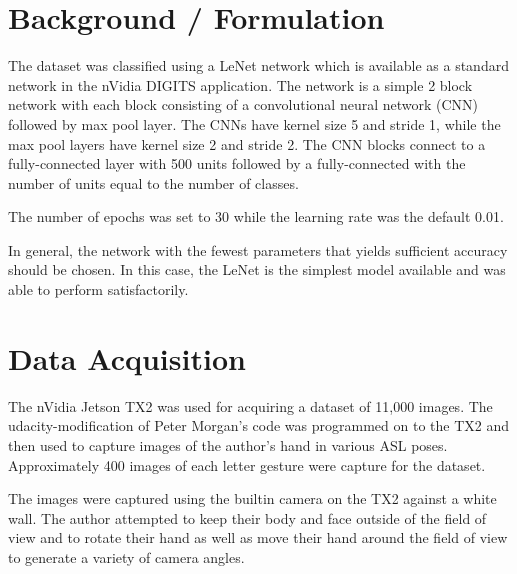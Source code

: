\documentclass[10pt,journal,compsoc]{IEEEtran}
\begin{document}
\section{Background / Formulation}
The dataset was classified using a LeNet\cite{Lecun98gradient-basedlearning} network which is available as a standard network in the nVidia DIGITS application. The network is a simple 2 block network with each block consisting of a convolutional neural network (CNN) followed by max pool layer. The CNNs have kernel size 5 and stride 1, while the max pool layers have kernel size 2 and stride 2. The CNN blocks connect to a fully-connected layer with 500 units followed by a fully-connected with the number of units equal to the number of classes.

The number of epochs was set to 30 while the learning rate was the default 0.01.

In general, the network with the fewest parameters that yields sufficient accuracy should be chosen. In this case, the LeNet is the simplest model available and was able to perform satisfactorily.

\section{Data Acquisition}
The nVidia Jetson TX2 was used for acquiring a dataset of 11,000 images. The udacity-modification of Peter Morgan's code\cite{PeterMoran} was programmed on to the TX2 and then used to capture images of the author's hand in various ASL poses. Approximately 400 images of each letter gesture were capture for the dataset.

The images were captured using the builtin camera on the TX2 against a white wall. The author attempted to keep their body and face outside of the field of view and to rotate their hand as well as move their hand around the field of view to generate a variety of camera angles.
\end{document}

